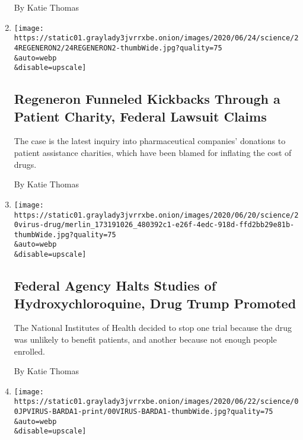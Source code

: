 \begin{enumerate}
  By Katie Thomas
\item
  \href{/2020/06/24/health/drug-kickbacks-regeneron.html}{}

  \texttt{[image: https://static01.graylady3jvrrxbe.onion/images/2020/06/24/science/24REGENERON2/24REGENERON2-thumbWide.jpg?quality=75\\\&auto=webp\\\&disable=upscale]}

  \hypertarget{regeneron-funneled-kickbacks-through-a-patient-charity-federal-lawsuit-claims}{%
  \subsection{Regeneron Funneled Kickbacks Through a Patient Charity,
  Federal Lawsuit
  Claims}\label{regeneron-funneled-kickbacks-through-a-patient-charity-federal-lawsuit-claims}}

  The case is the latest inquiry into pharmaceutical companies'
  donations to patient assistance charities, which have been blamed for
  inflating the cost of drugs.

  By Katie Thomas
\item
  \href{/2020/06/20/health/hydroxychloroquine-coronavirus-trial.html}{}

  \texttt{[image: https://static01.graylady3jvrrxbe.onion/images/2020/06/20/science/20virus-drug/merlin\_173191026\_480392c1-e26f-4edc-918d-ffd2bb29e81b-thumbWide.jpg?quality=75\\\&auto=webp\\\&disable=upscale]}

  \hypertarget{federal-agency-halts-studies-of-hydroxychloroquine-drug-trump-promoted}{%
  \subsection{Federal Agency Halts Studies of Hydroxychloroquine, Drug
  Trump
  Promoted}\label{federal-agency-halts-studies-of-hydroxychloroquine-drug-trump-promoted}}

  The National Institutes of Health decided to stop one trial because
  the drug was unlikely to benefit patients, and another because not
  enough people enrolled.

  By Katie Thomas
\item
  \href{/2020/06/19/health/coronavirus-lung-treatment-funding.html}{}

  \texttt{[image: https://static01.graylady3jvrrxbe.onion/images/2020/06/22/science/00JPVIRUS-BARDA1-print/00VIRUS-BARDA1-thumbWide.jpg?quality=75\\\&auto=webp\\\&disable=upscale]}

  \hypertarget{coronavirus-attacks-the-lungs-a-federal-agency-just-halted-funding-for-new-lung-treatments}{%
}
\end{enumerate}
